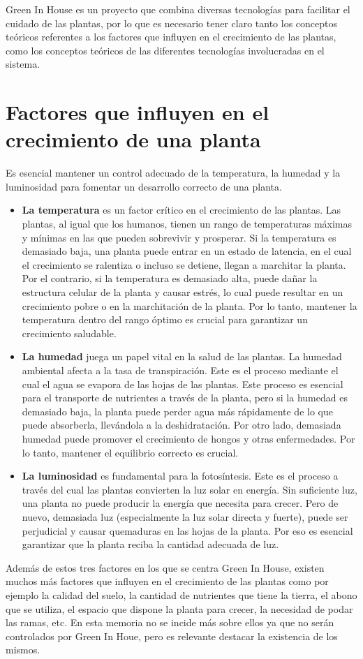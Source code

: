 
Green In House es un proyecto que combina diversas tecnologías para facilitar el cuidado de las plantas, por lo que es necesario tener claro tanto los conceptos teóricos referentes a los factores que influyen en el crecimiento de las plantas, como los conceptos teóricos de las diferentes tecnologías involucradas en el sistema.

\section{Factores que influyen en el crecimiento de una planta}
Es esencial mantener un control adecuado de la temperatura, la humedad y la luminosidad para fomentar un desarrollo correcto de una planta.
\begin{itemize}
    \item \textbf{La temperatura} es un factor crítico en el crecimiento de las plantas. Las plantas, al igual que los humanos, tienen un rango de temperaturas máximas y mínimas en las que pueden sobrevivir y prosperar. Si la temperatura es demasiado baja, una planta puede entrar en un estado de latencia, en el cual el crecimiento se ralentiza o incluso se detiene, llegan a marchitar la planta. Por el contrario, si la temperatura es demasiado alta, puede dañar la estructura celular de la planta y causar estrés, lo cual puede resultar en un crecimiento pobre o en la marchitación de la planta. Por lo tanto, mantener la temperatura dentro del rango óptimo es crucial para garantizar un crecimiento saludable.
    \item \textbf{La humedad} juega un papel vital en la salud de las plantas. La humedad ambiental afecta a la tasa de transpiración. Este es el proceso mediante el cual el agua se evapora de las hojas de las plantas. Este proceso es esencial para el transporte de nutrientes a través de la planta, pero si la humedad es demasiado baja, la planta puede perder agua más rápidamente de lo que puede absorberla, llevándola a la deshidratación. Por otro lado, demasiada humedad puede promover el crecimiento de hongos y otras enfermedades. Por lo tanto, mantener el equilibrio correcto es crucial.  
    \item \textbf{La luminosidad} es fundamental para la fotosíntesis. Este es el proceso a través del cual las plantas convierten la luz solar en energía. Sin suficiente luz, una planta no puede producir la energía que necesita para crecer. Pero de nuevo, demasiada luz (especialmente la luz solar directa y fuerte), puede ser perjudicial y causar quemaduras en las hojas de la planta. Por eso es esencial garantizar que la planta reciba la cantidad adecuada de luz.
\end{itemize}
Además de estos tres factores en los que se centra Green In House, existen muchos más factores que influyen en el crecimiento de las plantas como por ejemplo la calidad del suelo, la cantidad de nutrientes que tiene la tierra, el abono que se utiliza, el espacio que dispone la planta para crecer, la necesidad de podar las ramas, etc. En esta memoria no se incide más sobre ellos ya que no serán controlados por Green In Houe, pero es relevante destacar la existencia de los mismos.

